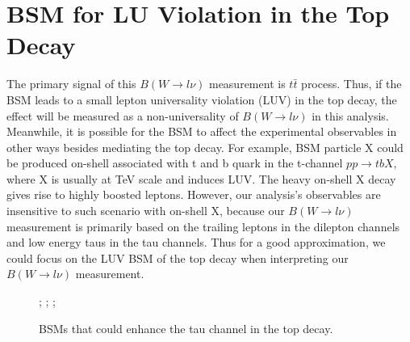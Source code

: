 

\section{BSM for LU Violation in the Top Decay}
\label{sec:relatedWorks:bsm}

The primary signal of this $B(W\to l \nu )$ measurement is $t\bar{t}$ process. Thus, if the BSM leads to a small lepton universality violation (LUV) in the top decay, the effect will be measured as a non-universality of $B(W\to l \nu )$ in this analysis. Meanwhile, it is possible for the BSM to affect the experimental observables in other ways besides mediating the top decay. For example, BSM particle X could be produced on-shell associated with t and b quark in the t-channel $pp \to t b X$, where X is usually at TeV scale and induces LUV. The heavy on-shell X decay gives rise to highly boosted leptons.  However, our analysis's observables are insensitive to such scenario with on-shell X, because our  $B(W\to l \nu )$ measurement is primarily based on the trailing leptons in the dilepton channels and low energy taus in the tau channels. Thus for a good approximation, we could focus on the LUV BSM of the top decay when interpreting our $B(W\to l \nu )$ measurement. 

\begin{figure}[ht]
    \centering
    ;\qquad
    ;\qquad
    ;
    \caption{BSMs that could enhance the tau channel in the top decay. }
   \label{fig:relatedWorks:bsm:topdecayBSM}
\end{figure}

